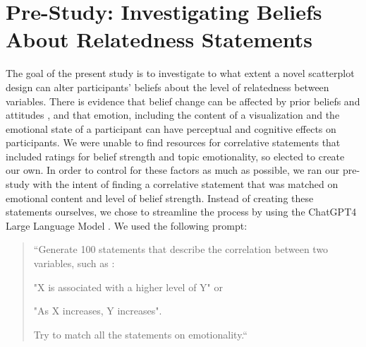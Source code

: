 \documentclass[manuscript,screen,review,anonymous]{acmart}
\begin{document}
\section{Pre-Study: Investigating Beliefs About Relatedness
Statements}\label{sec-pre-study}

The goal of the present study is to investigate to what extent a novel
scatterplot design can alter participants' beliefs about the level of
relatedness between variables. There is evidence that belief change can
be affected by prior beliefs and attitudes
\citep{xiong_2022, markant_2023}, and that emotion, including the
content of a visualization \citep{phelps_2006, harrison_2013} and the
emotional state of a participant \citep{thoresen_2016} can have
perceptual and cognitive effects on participants. We were unable to find
resources for correlative statements that included ratings for belief
strength and topic emotionality, so elected to create our own. In order
to control for these factors as much as possible, we ran our pre-study
with the intent of finding a correlative statement that was matched on
emotional content and level of belief strength. Instead of creating
these statements ourselves, we chose to streamline the process by using
the ChatGPT4 Large Language Model \citep{chat_gpt}. We used the
following prompt:

\begin{quotation}

    ``Generate 100 statements that describe the correlation between two variables, such as :

     "X is associated with a higher level of Y" or

     "As X increases, Y increases".

    Try to match all the statements on emotionality.``
    
\end{quotation}
\end{document}
